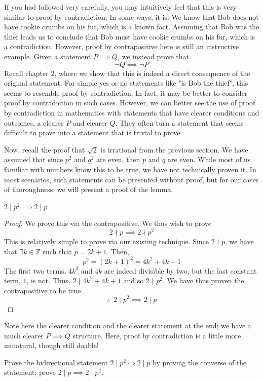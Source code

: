 If you had followed very carefully, you may intuitively feel that this is very similar to proof by contradiction. In some ways, it is. We know that Bob does not have cookie crumbs on his fur, which is a known fact. Assuming that Bob was the thief leads us to conclude that Bob must have cookie crumbs on his fur, which is a contradiction. However, proof by contrapositive here is still an instructive example. Given a statement $P \implies Q$, we instead prove that 
\[
\neg Q \implies \neg P
\]
Recall chapter 2, where we show that this is indeed a direct consequence of the original statement. For simple yes or no statements like "is Bob the thief", this seems to resemble proof by contradiction. In fact, it may be better to consider proof by contradiction in such cases. However, we can better see the use of proof by contradiction in mathematics with statements that have clearer conditions and outcomes, a clearer $P$ and clearer $Q$. They often turn a statement that seems difficult to prove into a statement that is trivial to prove. 

Now, recall the proof that $\sqrt{2}$ is irrational from the previous section. We have assumed that since $p^2$ and $q^2$ are even, then $p$ and $q$ are even. While most of us familiar with numbers know this to be true, we have not technically proven it. In most scenarios, such statements can be presented without proof, but for our cases of thoroughness, we will present a proof of the lemma. 

\begin{lemma} 
$2 \mid p^2 \implies 2 \mid p$
\end{lemma}
\begin{proof}
We prove this via the contrapositive. We thus wish to prove
\[
2 \nmid p \implies 2 \nmid p^2
\]
This is relatively simple to prove via our existing technique. Since $2 \nmid p$, we have that $\exists k \in \mathbb{Z}$ such that $p = 2k+1$. Then, 
\[
p^2 = (2k+1)^2 = 4k^2 + 4k + 1
\]
The first two terms, $4k^2$ and $4k$ are indeed divisible by two, but the last constant term, $1$, is not. Thus, $2 \nmid 4k^2 + 4k + 1$ and so $2 \nmid p^2$. We have thus proven the contrapositive to be true. 
\[
\therefore ~~ 2 \mid p^2 \implies 2 \mid p
\]
\end{proof}

Note here the clearer condition and the clearer statement at the end; we have a much clearer $P \implies Q$ structure. Here, proof by contradiction is a little more unnatural, though still doable!

\begin{exercise}
    Prove the bidirectional statement $2 \mid p^2 \iff 2 \mid p$ by proving the converse of the statement; prove $2 \mid p \implies 2 \mid p^2$.
\end{exercise}

